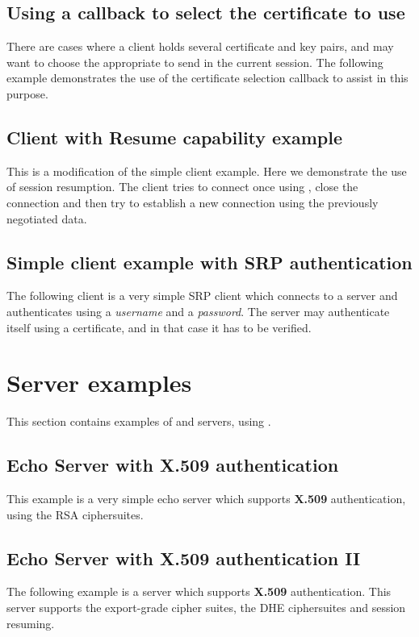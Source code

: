 

\subsection{Using a callback to select the certificate to use}
There are cases where a client holds several certificate and key pairs,
and may want to choose the appropriate to send in the current session.
The following example demonstrates the use of the certificate selection callback
to assist in this purpose.
\par




\subsection{Client with Resume capability example}
\label{resume-example}
This is a modification of the simple client example. Here we demonstrate
the use of session resumption. The client tries to connect once using
\tls{}, close the connection and then try to establish a new connection
using the previously negotiated data.


\subsection{Simple client example with SRP authentication}
The following client
is a very simple SRP \tls{} client which connects to a server 
and authenticates using a {\it username} and a {\it password}. The
server may authenticate itself using a certificate, and in that case it
has to be verified.


\section{Server examples}
This section contains examples of \tls{} and \ssl{} servers, using \gnutls{}.

\subsection{Echo Server with X.509 authentication}
This example is a very simple echo server which supports {\bf X.509} authentication,
using the RSA ciphersuites.


\subsection{Echo Server with X.509 authentication II}
The following example is a server which supports {\bf X.509} authentication.
This server supports the export-grade cipher suites, the DHE ciphersuites
and session resuming.


